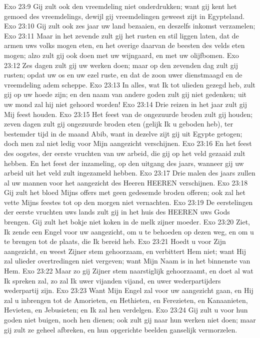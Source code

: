 Exo 23:9  Gij zult ook den vreemdeling niet onderdrukken; want gij kent het gemoed des vreemdelings, dewijl gij vreemdelingen geweest zijt in Egypteland.
Exo 23:10  Gij zult ook zes jaar uw land bezaaien, en deszelfs inkomst verzamelen;
Exo 23:11  Maar in het zevende zult gij het rusten en stil liggen laten, dat de armen uws volks mogen eten, en het overige daarvan de beesten des velds eten mogen; alzo zult gij ook doen met uw wijngaard, en met uw olijfbomen.
Exo 23:12  Zes dagen zult gij uw werken doen; maar op den zevenden dag zult gij rusten; opdat uw os en uw ezel ruste, en dat de zoon uwer dienstmaagd en de vreemdeling adem scheppe.
Exo 23:13  In alles, wat Ik tot ulieden gezegd heb, zult gij op uw hoede zijn; en den naam van andere goden zult gij niet gedenken; uit uw mond zal hij niet gehoord worden!
Exo 23:14  Drie reizen in het jaar zult gij Mij feest houden.
Exo 23:15  Het feest van de ongezuurde broden zult gij houden; zeven dagen zult gij ongezuurde broden eten (gelijk Ik u geboden heb), ter bestemder tijd in de maand Abib, want in dezelve zijt gij uit Egypte getogen; doch men zal niet ledig voor Mijn aangezicht verschijnen.
Exo 23:16  En het feest des oogstes, der eerste vruchten van uw arbeid, die gij op het veld gezaaid zult hebben. En het feest der inzameling, op den uitgang des jaars, wanneer gij uw arbeid uit het veld zult ingezameld hebben.
Exo 23:17  Drie malen des jaars zullen al uw mannen voor het aangezicht des Heeren HEEREN verschijnen.
Exo 23:18  Gij zult het bloed Mijns offers met geen gedesemde broden offeren; ook zal het vette Mijns feestes tot op den morgen niet vernachten.
Exo 23:19  De eerstelingen der eerste vruchten uws lands zult gij in het huis des HEEREN uws Gods brengen. Gij zult het bokje niet koken in de melk zijner moeder.
Exo 23:20  Ziet, Ik zende een Engel voor uw aangezicht, om u te behoeden op dezen weg, en om u te brengen tot de plaats, die Ik bereid heb.
Exo 23:21  Hoedt u voor Zijn aangezicht, en weest Zijner stem gehoorzaam, en verbittert Hem niet; want Hij zal ulieder overtredingen niet vergeven; want Mijn Naam is in het binnenste van Hem.
Exo 23:22  Maar zo gij Zijner stem naarstiglijk gehoorzaamt, en doet al wat Ik spreken zal, zo zal Ik uwer vijanden vijand, en uwer wederpartijders wederpartij zijn.
Exo 23:23  Want Mijn Engel zal voor uw aangezicht gaan, en Hij zal u inbrengen tot de Amorieten, en Hethieten, en Ferezieten, en Kanaanieten, Hevieten, en Jebusieten; en Ik zal hen verdelgen.
Exo 23:24  Gij zult u voor hun goden niet buigen, noch hen dienen; ook zult gij naar hun werken niet doen; maar gij zult ze geheel afbreken, en hun opgerichte beelden ganselijk vermorzelen.
